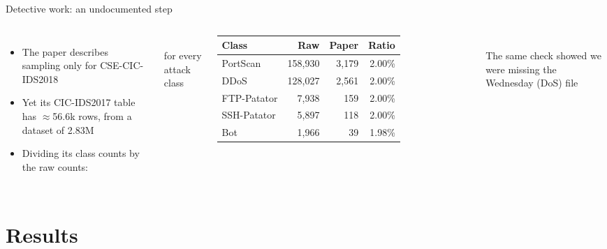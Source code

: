 \documentclass[aspectratio=169,11pt]{beamer}
\newcommand{\bignum}[1]{{\Large\bfseries #1}}
\begin{document}
\begin{frame}{Detective work: an undocumented step}
\begin{columns}[c]
\begin{itemize}\small
  \item The paper describes sampling only for CSE-CIC-IDS2018
  \item Yet its CIC-IDS2017 table has $\approx$56.6k rows, from a dataset of 2.83M
  \item Dividing its class counts by the raw counts:
\end{itemize}
\vspace{2mm}
\centering\bignum{Exactly 2\%} \\ {\small for every attack class}
\centering
\begin{tabular}{lrrr}
\toprule
Class & Raw & Paper & Ratio \\
\midrule
PortScan    & 158{,}930 & 3{,}179 & 2.00\% \\
DDoS        & 128{,}027 & 2{,}561 & 2.00\% \\
FTP-Patator & 7{,}938   & 159     & 2.00\% \\
SSH-Patator & 5{,}897   & 118     & 2.00\% \\
Bot         & 1{,}966   & 39      & 1.98\% \\
\bottomrule
\end{tabular}\\[6pt]
{\small The same check showed we were missing the Wednesday (DoS) file}
\end{columns}
\end{frame}

\section{Results}
\end{document}
